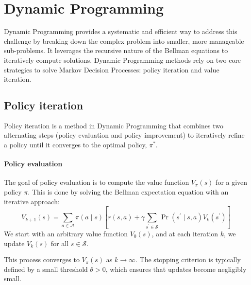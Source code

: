 \section{Dynamic Programming}

Dynamic Programming provides a systematic and efficient way to address this challenge by breaking down the complex problem into smaller, more manageable sub-problems. 
It leverages the recursive nature of the Bellman equations to iteratively compute solutions.
Dynamic Programming methods rely on two core strategies to solve Markov Decision Processes: policy iteration and value iteration.

\subsection{Policy iteration}
Policy iteration is a method in Dynamic Programming that combines two alternating steps (policy evaluation and policy improvement) to iteratively refine a policy until it converges to the optimal policy, $\pi^\ast$.

\paragraph*{Policy evaluation}
The goal of policy evaluation is to compute the value function $V_{\pi}(s)$ for a given policy $\pi$. 
This is done by solving the Bellman expectation equation with an iterative approach:
\[V_{k+1}(s)=\sum_{a\in\mathcal{A}}\pi(a\mid s)\left[r(s,a)+\gamma\sum_{s^\prime\in\mathcal{S}}\Pr(s^\prime\mid s,a)V_{k}(s^\prime)\right]\]
We start with an arbitrary value function $V_0(s)$, and at each iteration $k$, we update $V_k(s)$ for all $s\in\mathcal{S}$.

This process converges to $V_\pi(s)$ as $k\rightarrow\infty$. 
The stopping criterion is typically defined by a small threshold $\theta>0$, which ensures that updates become negligibly small.

